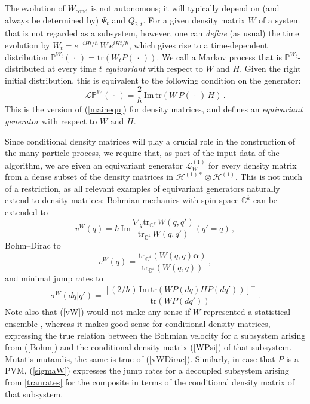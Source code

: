 \documentclass[12pt]{article}
\newcommand{\CCC}{\mathbb{C}} %
\newcommand{\E}{e} %
\newcommand{\I}{i} %
\newcommand{\1}{\mathbf{1}} %
\newcommand{\tr}{\mathrm{tr}} %
\renewcommand{\Im}{\mathrm{Im}} %
\newcommand{\Hilbert}{\mathscr{H}}
\newcommand{\measure}{\mathbb{P}} %
\newcommand{\generator}{\mathscr{L}} %
\newcommand{\pov}{{P}}%
\newcommand{\valpha}{{\boldsymbol \alpha}}
\newcommand{\cond}{\mathrm{cond}} %
\begin{document}
The evolution of $W_\cond$ is not autonomous; it will typically depend
on (and always be determined by) $\Psi_t$ and $Q_{2,t}$. For a given
density matrix $W$ of a system that is not regarded as a subsystem,
however, one can \emph{define} (as usual) the time evolution by $W_t =
\E^{-\I H t/\hbar} \, W \, \E^{\I H t/\hbar}$, which gives rise to a
time-dependent distribution $\measure^{W_t} (\,\cdot\,) = \tr (W_t
\pov(\,\cdot\,))$. We call a Markov process that is
$\measure^{W_t}$-distributed at every time $t$ \emph{equivariant} with
respect to $W$ and $H$. Given the right initial distribution, this is
equivalent to the following condition on the generator:
\begin{equation}\label{Wequi}
   \generator \measure^W (\,\cdot\,) = \frac{2}{\hbar} \, \Im \,
   \tr(W \, \pov(\,\cdot\,) \, H)\,.
\end{equation}
This is the version of (\ref{mainequ}) for density matrices, and
defines an \emph{equivariant generator} with respect to $W$ and $H$.

Since conditional density matrices will play a crucial role in the
construction of the many-particle process, we require that, as part of
the input data of the algorithm, we are given an equivariant generator
$\generator^{(1)}_W$ for every density matrix from a dense subset of
the density matrices in $\Hilbert^{(1)*} \otimes \Hilbert^{(1)}$.
This is not much of a restriction, as all relevant examples of
equivariant generators naturally extend to density matrices: Bohmian
mechanics with spin space $\CCC^k$ can be extended \cite{Belldensity}
to
\begin{equation}\label{vW}
   v^W(q) = \hbar \, \Im \, \frac{\nabla_{q} \tr_{\CCC^k} \,
   W(q,q')}{\tr_{\CCC^k} \, W(q,q')} (q'=q)\,,
\end{equation}
Bohm--Dirac to
\begin{equation}\label{vWDirac}
   v^W(q) = \frac{\tr_{\CCC^4} (W(q,q) \valpha)}{\tr_{\CCC^4}
   (W(q,q))} \,,
\end{equation}
and minimal jump rates to
\begin{equation}\label{sigmaW}
   \sigma^W (dq|q') = \frac{[(2/\hbar)\, \Im \, \tr(W \pov(dq) H
   \pov(dq'))]^+} {\tr(W \pov(dq'))} \,.
\end{equation}
Note also that (\ref{vW}) would not make any sense if $W$ represented
a statistical ensemble \cite{Belldensity}, whereas it makes good sense
for conditional density matrices, expressing the true relation between
the Bohmian velocity for a subsystem arising from (\ref{Bohm}) and the
conditional density matrix (\ref{WPsi}) of that subsystem. Mutatis
mutandis, the same is true of (\ref{vWDirac}). Similarly, in case that
$\pov$ is a PVM, (\ref{sigmaW}) expresses the jump rates for a
decoupled subsystem arising from \eqref{tranrates} for the composite
in terms of the conditional density matrix of that subsystem.
\end{document}

